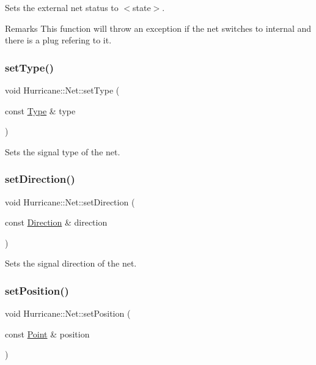 Sets the external net status to {\ttfamily $<$state$>$}.

\begin{DoxyRemark}{Remarks}
This function will throw an exception if the net switches to internal and there is a plug refering to it. 
\end{DoxyRemark}
\mbox{\label{classHurricane_1_1Net_a83f5ce12291b0ec5ab584d515dd8963c}} 
\subsubsection{\texorpdfstring{set\+Type()}{setType()}}
{\footnotesize\ttfamily void Hurricane\+::\+Net\+::set\+Type (\begin{DoxyParamCaption}\item[{const \mbox{\hyperlink{classHurricane_1_1Net_1_1Type}{Type}} \&}]{type }\end{DoxyParamCaption})}

Sets the signal type of the net. \mbox{\label{classHurricane_1_1Net_ac33d13bb0ddc60f369d5bfcffc4bb0f8}} 
\subsubsection{\texorpdfstring{set\+Direction()}{setDirection()}}
{\footnotesize\ttfamily void Hurricane\+::\+Net\+::set\+Direction (\begin{DoxyParamCaption}\item[{const \mbox{\hyperlink{classHurricane_1_1Net_1_1Direction}{Direction}} \&}]{direction }\end{DoxyParamCaption})}

Sets the signal direction of the net. \mbox{\label{classHurricane_1_1Net_a0a3a3232a74ebced14b14029c5199561}} 
\subsubsection{\texorpdfstring{set\+Position()}{setPosition()}}
{\footnotesize\ttfamily void Hurricane\+::\+Net\+::set\+Position (\begin{DoxyParamCaption}\item[{const \mbox{\hyperlink{classHurricane_1_1Point}{Point}} \&}]{position }\end{DoxyParamCaption})}

